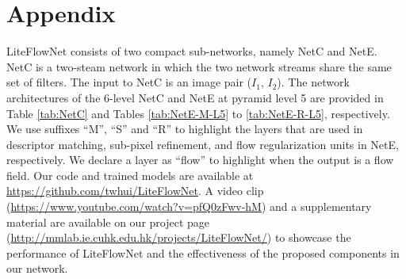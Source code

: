 \documentclass[10pt,twocolumn,letterpaper]{article}
\begin{document}
\section{Appendix}
LiteFlowNet consists of two compact sub-networks, namely NetC and NetE. NetC is a two-steam network in which the two network streams share the same set of filters. The input to NetC is an image pair ($I_{1}$, $I_{2}$). The network architectures of the 6-level NetC and NetE at pyramid level 5 are provided in Table \ref{tab:NetC} and Tables \ref{tab:NetE-M-L5} to \ref{tab:NetE-R-L5}, respectively. We use suffixes ``M'', ``S'' and ``R'' to highlight the layers that are used in descriptor matching, sub-pixel refinement, and flow regularization units in NetE, respectively. We declare a layer as ``flow'' to highlight when the output is a flow field. Our code and trained models are available at \url{https://github.com/twhui/LiteFlowNet}. A video clip (\url{https://www.youtube.com/watch?v=pfQ0zFwv-hM}) and a supplementary material are available on our project page (\url{http://mmlab.ie.cuhk.edu.hk/projects/LiteFlowNet/}) to showcase the performance of LiteFlowNet and the effectiveness of the proposed components in our network. 
\end{document}

